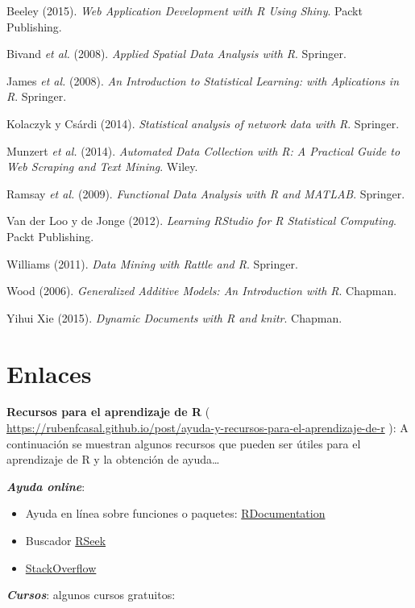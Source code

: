 \documentclass[
]{book}
\theoremstyle{break}
\begin{document}
Beeley (2015). \emph{Web Application Development with R Using Shiny}.
Packt Publishing.

Bivand \emph{et al.} (2008). \emph{Applied Spatial Data Analysis with R}. Springer.

James \emph{et al.} (2008). \emph{An Introduction to Statistical Learning: with
Aplications in R}. Springer.

Kolaczyk y Csárdi (2014). \emph{Statistical analysis of network data with R}. Springer.

Munzert \emph{et al.} (2014). \emph{Automated Data Collection with R:
A Practical Guide to Web Scraping and Text Mining}. Wiley.

Ramsay \emph{et al.} (2009). \emph{Functional Data Analysis with R and MATLAB}.
Springer.

Van der Loo y de Jonge (2012). \emph{Learning RStudio for R Statistical
Computing}. Packt Publishing.

Williams (2011). \emph{Data Mining with Rattle and R}. Springer.

Wood (2006). \emph{Generalized Additive Models: An Introduction with R}. Chapman.

Yihui Xie (2015). \emph{Dynamic Documents with R and knitr}. Chapman.

\hypertarget{appendix-apendices}{%
\appendix}


\hypertarget{links}{%
\chapter{Enlaces}\label{links}}

\textbf{Recursos para el aprendizaje de R} ( \url{https://rubenfcasal.github.io/post/ayuda-y-recursos-para-el-aprendizaje-de-r}
): A continuación se muestran algunos recursos que pueden ser útiles para el aprendizaje de R y la obtención de ayuda\ldots{}

\textbf{\emph{Ayuda online}}:

\begin{itemize}
\item
  Ayuda en línea sobre funciones o paquetes: \href{https://www.rdocumentation.org/}{RDocumentation}
\item
  Buscador \href{http://rseek.org/}{RSeek}
\item
  \href{http://stackoverflow.com/questions/tagged/r}{StackOverflow}
\end{itemize}

\textbf{\emph{Cursos}}:
algunos cursos gratuitos:
\end{document}
